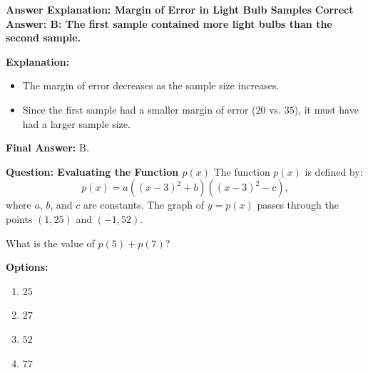 \documentclass{beamer}
\begin{document}
\begin{frame}{\textbf{Answer Explanation: Margin of Error in Light Bulb Samples}}
    \textbf{Correct Answer: \textcolor{novelPurple}{B: The first sample contained more light bulbs than the second sample.}}

    \vspace{0.3cm}
    \textbf{Explanation:}
    \begin{itemize}
        \item The margin of error decreases as the sample size increases.
        \item Since the first sample had a smaller margin of error (\(20\) vs. \(35\)), it must have had a larger sample size.
    \end{itemize}

    \textbf{Final Answer:} \( \boxed{\text{B}} \).
\end{frame}
\begin{frame}{\textbf{Question: Evaluating the Function \( p(x) \)}}
    The function \(p(x)\) is defined by:
    \[
    p(x) = a\left( (x - 3)^2 + b \right)((x - 3)^2 - c),
    \]
    where \(a\), \(b\), and \(c\) are constants. The graph of \(y = p(x)\) passes through the points \((1, 25)\) and \((-1, 52)\). 

    \vspace{0.3cm}
    What is the value of \(p(5) + p(7)\)?

    \vspace{0.5cm}
    \textbf{Options:}
    \begin{enumerate}
        \item[A] \(25\)
        \item[B] \(27\)
        \item[C] \(52\)
        \item[D] \(77\)
    \end{enumerate}
\end{frame}
\end{document}
